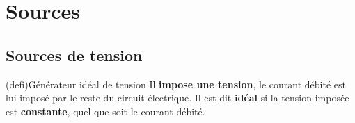 \documentclass[../../main/main.tex]{subfiles}
\begin{document}
\section{Sources}
\subsection{Sources de tension}

\begin{tcb*}[label=def:gentens, sidebyside, righthand ratio=.2](defi){Générateur
			idéal de tension}
	Il \textbf{impose une tension}, le courant débité est lui imposé par le reste
	du circuit électrique. Il est dit \textbf{idéal} si la tension imposée est
	\textbf{constante}, quel que soit le courant débité.
	\tcblower
	\vspace{-10pt}
	\begin{center}
		\vspace{-10pt}
	\end{center}
\end{tcb*}
\end{document}
